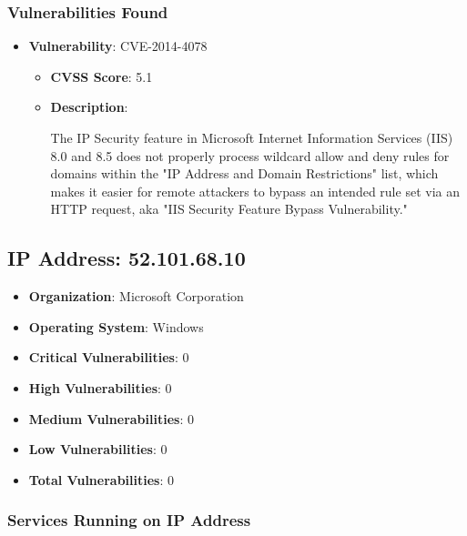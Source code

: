 \documentclass{article}
\begin{document}
\subsubsection*{Vulnerabilities Found}

\begin{itemize}
    
        \item \textbf{Vulnerability}: CVE-2014-4078
        \begin{itemize}
            \item \textbf{CVSS Score}:  5.1 
            \item \textbf{Description}:
            \parbox[t]{0.9\linewidth}{
                \ttfamily The IP Security feature in Microsoft Internet Information Services (IIS) 8.0 and 8.5 does not properly process wildcard allow and deny rules for domains within the "IP Address and Domain Restrictions" list, which makes it easier for remote attackers to bypass an intended rule set via an HTTP request, aka "IIS Security Feature Bypass Vulnerability."
            }
        \end{itemize}
    
\end{itemize}




\clearpage



\subsection*{IP Address: 52.101.68.10}

\begin{itemize}
    \item \textbf{Organization}: Microsoft Corporation
    \item \textbf{Operating System}:  Windows 
    \item \textbf{Critical Vulnerabilities}: 0
    \item \textbf{High Vulnerabilities}: 0
    \item \textbf{Medium Vulnerabilities}: 0
    \item \textbf{Low Vulnerabilities}: 0
    \item \textbf{Total Vulnerabilities}: 0
\end{itemize}

\subsubsection*{Services Running on IP Address}
\end{document}
